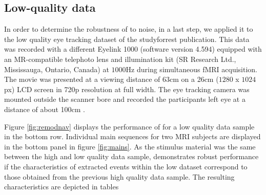 \subsection*{Low-quality data}\label{ana_3}

In order to determine the robustness of \remodnav to noise, in a last step, we applied it to the low quality eye tracking dataset of the studyforrest publication. This data was recorded with a different Eyelink 1000 (software version 4.594) equipped with an MR-compatible telephoto lens and illumination kit (SR Research Ltd., Mississauga, Ontario, Canada) at $1000$Hz during simultaneous fMRI acquisition. The movie was presented at a viewing distance of $63$cm on a 26cm ($1280$ x $1024$px) LCD screen in 720p resolution at full width. The eye tracking camera was mounted outside the scanner bore and recorded the participants left eye at a distance of about 100cm \citep{Hanke2016}. 

Figure \ref{fig:remodnav} displays the performance of \remodnav for a low quality data sample in the bottom row. Individual main sequences for two MRI subjects are displayed in the bottom panel in figure \ref{fig:mains}. As the stimulus material was the same between the high and low quality data sample, \remodnav demonstrates robust performance if the characteristics of extracted events within the low dataset correspond to those obtained from the previous high quality data sample. The resulting characteristics are depicted in tables 





